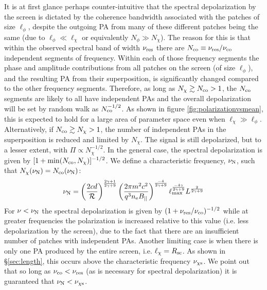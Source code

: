 \documentclass[fleqn,usenatbib]{mnras}
\begin{document}
	
	It is at first glance perhaps counter-intuitive that the spectral depolarization by the screen is dictated by the coherence bandwidth associated with the patches of size $\ell_{\phi}$, despite the outgoing PA from many of these different patches being the same (due to $\ell_{\phi}\ll \ell_{\chi}$ or equivalently $N_{\phi}\gg N_{\chi}$). The reason for this is that within the observed spectral band of width $\nu_{\rm res}$ there are $N_{\rm co}\equiv \nu_{\rm res}/\nu_{\rm co}$ independent segments of frequency. Within each of those frequency segments the phase and amplitude contributions from all patches on the screen (of size $\ell_{\phi}$), and the resulting PA from their superposition, is significantly changed compared to the other frequency segments. 
	Therefore, as long as $N_{\chi}\gtrsim N_{\rm co}>1$, the $N_{\rm co}$ segments are likely to all have independent PAs and the overall depolarization will be set by random walk as $N_{\rm co}^{-1/2}$. As shown in figure \ref{fig:polarizationvsmean}, this is expected to hold for a large area of parameter space even when $\ell_{\chi}\gg \ell_{\phi}$. Alternatively, if $N_{\rm co}\gtrsim N_{\chi}>1$, the number of independent PAs in the superposition is reduced and limited by $N_{\chi}$. The signal is still depolarized, but to a lesser extent, with $\Pi\propto N_{\chi}^{-1/2}$. In the general case, the spectral depolarization is given by $[1+\min(N_{\rm co},N_{\chi})]^{-1/2}$. We define a characteristic frequency, $\nu_{\rm N}$, such that $N_{\chi}(\nu_{\rm N})=N_{\rm co}(\nu_{\rm N})$:
	\begin{eqnarray}
		\label{eq:nuN}
		\nu_{\rm N}=\left(\frac{2cd}{\mathcal{R}}\right)^{2\gamma+1\over 2\gamma+9} \left( {2\pi m^2 c^2 \over q^3 n_{\rm e} B_{||}}\right)^{-4\over 2\gamma+9}\ell_{\rm max}^{-4\gamma\over 2\gamma+9}L^{2\over 2\gamma+9}
	\end{eqnarray}
	For $\nu<\nu_{\rm N}$ the spectral depolarization is given by $(1+\nu_{\rm res}/\nu_{\rm co})^{-1/2}$ while at greater frequencies the polarization is increased relative to this value (i.e. less depolarization by the screen), due to the fact that there are an insufficient number of patches with independent PAs. Another limiting case is when there is only one PA produced by the entire screen, i.e. $\ell_{\chi}=R_{\rm sc}$. As shown in \S \ref{sec:length}, this occurs above the characteristic frequency $\nu_{\chi\rm s}$. We point out that so long as $\nu_{\rm co}<\nu_{\rm res}$ (as is necessary for spectral depolarization) it is guaranteed that $\nu_{\rm N}<\nu_{\chi\rm s}$. 
	
\end{document}
